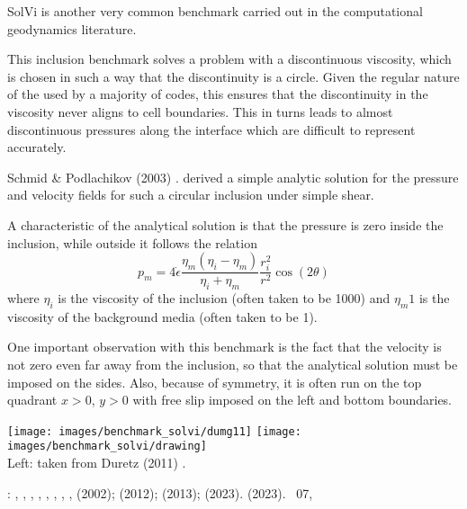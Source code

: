 SolVi is another very common benchmark carried out in the computational 
geodynamics literature.

This inclusion benchmark solves a problem with a discontinuous viscosity, 
which is chosen in such a way that the discontinuity is a circle. 
Given the regular nature of the used by a majority of codes, 
this ensures that the discontinuity in the viscosity never aligns to cell boundaries.
This in turns leads to almost discontinuous pressures along the interface which are difficult 
to represent accurately.

Schmid \& Podlachikov (2003) \cite{scpo03}. 
derived a simple analytic solution for the pressure and velocity fields for such a circular 
inclusion under simple shear.

A characteristic of the analytical solution is that the pressure is zero 
inside the inclusion, while outside it follows the relation
\[
p_m = 4 \dot{\epsilon}
\frac{\eta_m(\eta_i-\eta_m)}{\eta_i+\eta_m}
\frac{r_i^2}{r^2} \cos(2\theta)
\]
where $\eta_i$ is the viscosity of the inclusion (often taken to be 1000)
and $\eta_m1$ is the viscosity of the background media (often taken to be 1). 

One important observation with this benchmark is the fact that the velocity is not zero even far 
away from the inclusion, so that the analytical solution must be imposed on the sides.
Also, because of symmetry, it is often run on the top quadrant $x>0$, $y>0$ with 
free slip imposed on the left and bottom boundaries. 

\begin{center}
\texttt{[image: images/benchmark\_solvi/dumg11]}
\texttt{[image: images/benchmark\_solvi/drawing]}\\
{\captionfont Left: taken from Duretz \etal (2011) \cite{dumg11}. }
\end{center}

\Literature: 
\textcite{kapo06},
\textcite{maie12},
\textcite{deka08},
\textcite{bepo10},
\textcite{sunh10},
\textcite{vosc15},
\textcite{demh19},
\textcite{aspectmanual},
\textcite{litu02} (2002); 
\textcite{krhb12} (2012); 
\textcite{gemd13} (2013);
\textcite{sedu23} (2023).
\textcite{bohm23} (2023).
\stone~07,
